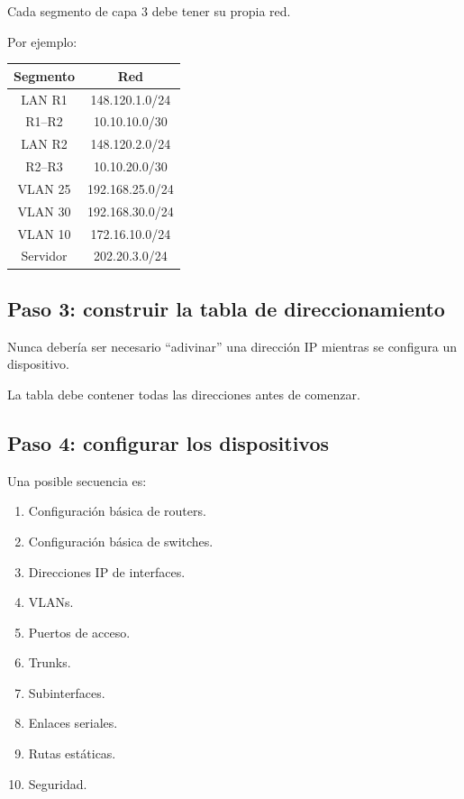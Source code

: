 \documentclass[12pt]{article}
\begin{document}
Cada segmento de capa 3 debe tener su propia red.

Por ejemplo:

\begin{center}
\begin{tabular}{|c|c|}
\hline
\textbf{Segmento} & \textbf{Red} \\
\hline
LAN R1 & 148.120.1.0/24 \\
R1--R2 & 10.10.10.0/30 \\
LAN R2 & 148.120.2.0/24 \\
R2--R3 & 10.10.20.0/30 \\
VLAN 25 & 192.168.25.0/24 \\
VLAN 30 & 192.168.30.0/24 \\
VLAN 10 & 172.16.10.0/24 \\
Servidor & 202.20.3.0/24 \\
\hline
\end{tabular}
\end{center}


\subsection{Paso 3: construir la tabla de direccionamiento}

Nunca debería ser necesario ``adivinar'' una dirección IP mientras se
configura un dispositivo.

La tabla debe contener todas las direcciones antes de comenzar.


\subsection{Paso 4: configurar los dispositivos}

Una posible secuencia es:

\begin{enumerate}
    \item Configuración básica de routers.
    \item Configuración básica de switches.
    \item Direcciones IP de interfaces.
    \item VLANs.
    \item Puertos de acceso.
    \item Trunks.
    \item Subinterfaces.
    \item Enlaces seriales.
    \item Rutas estáticas.
    \item Seguridad.
\end{enumerate}
\end{document}
